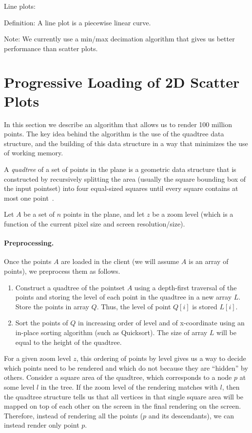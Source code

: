 \documentclass[11pt,a4paper]{article}
\begin{document}
Line plots:

Definition: A line plot is a piecewise linear curve. 

Note: We currently use a min/max decimation algorithm that gives us better performance than scatter plots. 
\fi


\section{Progressive Loading of 2D Scatter Plots}

In this section we describe an algorithm that allows us to render 100 million points.
The key idea behind the algorithm is the use of the quadtree data structure,
and the building of this data structure in a way that minimizes the use of working memory. 


A \emph{quadtree} of a set of points in the plane is a geometric data structure that is constructed by recursively splitting the 
area (usually the square bounding box of the input pointset) into four equal-sized squares
until every square contains at most one point~\cite{quadtrees74}.

Let $A$ be a set of $n$ points in the plane, and let $z$ be a zoom level 
(which is a function of the current pixel size and screen resolution/size).  %

\paragraph{Preprocessing. } 
Once the points $A$ are loaded in the client (we will assume $A$ is an array of points), we preprocess them as follows.
\begin{enumerate}
\item Construct a quadtree of the pointset $A$ using a depth-first traversal of the points and 
	storing the level of each point in the quadtree in a new array $L$. 
	Store the points in array $Q$.  Thus, the level of point $Q[i]$ is stored $L[i]$.
\item Sort the points of $Q$ in increasing order of level and of x-coordinate using an in-place sorting algorithm (such as Quicksort).
	The size of array $L$ will be equal to the height of the quadtree.
\end{enumerate}

For a given zoom level $z$, this ordering of points by level gives us a way to decide which points need to be rendered
and which do not because they are ``hidden'' by others. 
Consider a square area of the quadtree, which corresponds to a node $p$ at some level $l$ in the tree. 
If the zoom level of the rendering matches with $l$, then the quadtree structure tells us that all vertices in that single square area 
will be mapped on top of each other on the screen in the final rendering on the screen. 
Therefore, instead of rendering all the points ($p$ and its descendants), we can instead render only point $p$. 
\end{document}
